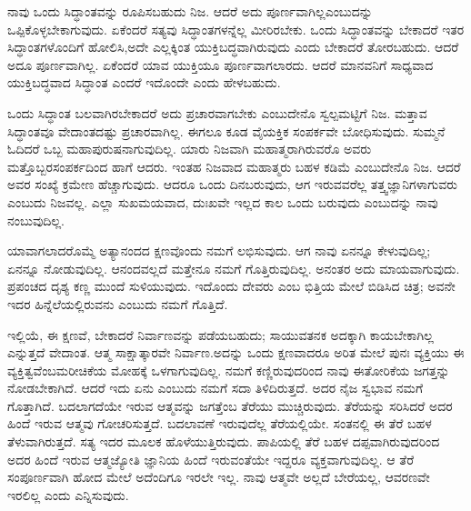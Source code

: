 ನಾವು ಒಂದು ಸಿದ್ಧಾಂತವನ್ನು ರೂಪಿಸಬಹುದು ನಿಜ. ಆದರೆ ಅದು ಪೂರ್ಣವಾಗಿಲ್ಲ\break ಎಂಬುದನ್ನು ಒಪ್ಪಿಕೊಳ್ಳಬೇಕಾಗುವುದು. ಏಕೆಂದರೆ ಸತ್ಯವು ಸಿದ್ಧಾಂತಗಳನ್ನೆಲ್ಲ ಮೀರಿರಬೇಕು. ಒಂದು ಸಿದ್ಧಾಂತವನ್ನು ಬೇಕಾದರೆ ಇತರ ಸಿದ್ಧಾಂತಗಳೊಂದಿಗೆ ಹೋಲಿಸಿ,\break ಅದೇ ಎಲ್ಲಕ್ಕಿಂತ ಯುಕ್ತಿಬದ್ಧವಾಗಿರುವುದು ಎಂದು ಬೇಕಾದರೆ ತೋರಬಹುದು. ಆದರೆ ಅದೂ ಪೂರ್ಣವಾಗಿಲ್ಲ. ಏಕೆಂದರೆ ಯಾವ ಯುಕ್ತಿಯೂ ಪೂರ್ಣವಾಗಲಾರದು. ಆದರೆ ಮಾನವನಿಗೆ ಸಾಧ್ಯವಾದ ಯುಕ್ತಿಬದ್ಧವಾದ ಸಿದ್ಧಾಂತ ಎಂದರೆ ಇದೊಂದೇ ಎಂದು ಹೇಳಬಹುದು.

ಒಂದು ಸಿದ್ಧಾಂತ ಬಲವಾಗಿರಬೇಕಾದರೆ ಅದು ಪ್ರಚಾರವಾಗಬೇಕು ಎಂಬುದೇನೊ ಸ್ವಲ್ಪಮಟ್ಟಿಗೆ ನಿಜ. ಮತ್ತಾವ ಸಿದ್ಧಾಂತವೂ ವೇದಾಂತದಷ್ಟು ಪ್ರಚಾರವಾಗಿಲ್ಲ. ಈಗಲೂ ಕೂಡ ವೈಯಕ್ತಿಕ ಸಂಪರ್ಕವೇ ಬೋಧಿಸುವುದು. ಸುಮ್ಮನೆ ಓದಿದರೆ ಒಬ್ಬ ಮಹಾಪುರುಷನಾಗುವುದಿಲ್ಲ. ಯಾರು ನಿಜವಾಗಿ ಮಹಾತ್ಮರಾಗಿರುವರೊ ಅವರು ಮತ್ತೊಬ್ಬರ\break ಸಂಪರ್ಕದಿಂದ ಹಾಗೆ ಆದರು. ಇಂತಹ ನಿಜವಾದ ಮಹಾತ್ಮರು ಬಹಳ ಕಡಿಮೆ ಎಂಬುದೇನೊ ನಿಜ. ಆದರೆ ಅವರ ಸಂಖ್ಯೆ ಕ್ರಮೇಣ ಹೆಚ್ಚಾಗುವುದು. ಆದರೂ ಒಂದು ದಿನ\break ಬರುವುದು, ಆಗ ಇರುವವರೆಲ್ಲ ತತ್ತ್ವಜ್ಞಾನಿಗಳಾಗುವರು ಎಂಬುದು ನಿಜವಲ್ಲ. ಎಲ್ಲಾ ಸುಖಮಯವಾದ, ದುಃಖವೇ ಇಲ್ಲದ ಕಾಲ ಒಂದು ಬರುವುದು ಎಂಬುದನ್ನು ನಾವು ನಂಬುವುದಿಲ್ಲ.

ಯಾವಾಗಲಾದರೊಮ್ಮೆ ಅತ್ಯಾನಂದದ ಕ್ಷಣವೊಂದು ನಮಗೆ ಲಭಿಸುವುದು. ಆಗ ನಾವು ಏನನ್ನೂ ಕೇಳುವುದಿಲ್ಲ; ಏನನ್ನೂ ನೋಡುವುದಿಲ್ಲ. ಆನಂದವಲ್ಲದೆ ಮತ್ತೇನೂ ನಮಗೆ ಗೊತ್ತಿರುವುದಿಲ್ಲ. ಅನಂತರ ಅದು ಮಾಯವಾಗುವುದು. ಪ್ರಪಂಚದ ದೃಶ್ಯ ಕಣ್ಣ ಮುಂದೆ ಸುಳಿಯುವುದು. ಇದೊಂದು ದೇವರು ಎಂಬ ಭಿತ್ತಿಯ ಮೇಲೆ ಬಿಡಿಸಿದ ಚಿತ್ರ; ಅವನೇ ಇದರ ಹಿನ್ನೆಲೆಯಲ್ಲಿರುವನು ಎಂಬುದು ನಮಗೆ ಗೊತ್ತಿದೆ.

ಇಲ್ಲಿಯೆ, ಈ ಕ್ಷಣವೆ, ಬೇಕಾದರೆ ನಿರ್ವಾಣವನ್ನು ಪಡೆಯಬಹುದು; ಸಾಯುವ\break ತನಕ ಅದಕ್ಕಾಗಿ ಕಾಯಬೇಕಾಗಿಲ್ಲ ಎನ್ನುತ್ತದೆ ವೇದಾಂತ. ಆತ್ಮ ಸಾಕ್ಷಾತ್ಕಾರವೇ ನಿರ್ವಾಣ.\break ಅದನ್ನು ಒಂದು ಕ್ಷಣವಾದರೂ ಅರಿತ ಮೇಲೆ ಪುನಃ ವ್ಯಕ್ತಿಯು ಈ ವ್ಯಕ್ತಿತ್ವವೆಂಬ\break ಮರೀಚಿಕೆಯ ಮೋಹಕ್ಕೆ ಒಳಗಾಗುವುದಿಲ್ಲ. ನಮಗೆ ಕಣ್ಣಿರುವುದರಿಂದ ನಾವು ಈ\break ತೋರಿಕೆಯ ಜಗತ್ತನ್ನು ನೋಡಬೇಕಾಗಿದೆ. ಆದರೆ ಇದು ಏನು ಎಂಬುದು ನಮಗೆ ಸದಾ ತಿಳಿದಿರುತ್ತದೆ. ಅದರ ನೈಜ ಸ್ವಭಾವ ನಮಗೆ ಗೊತ್ತಾಗಿದೆ. ಬದಲಾಗದೆಯೇ ಇರುವ ಆತ್ಮವನ್ನು ಜಗತ್ತೆಂಬ ತೆರೆಯು ಮುಚ್ಚಿರುವುದು. ತೆರೆಯನ್ನು ಸರಿಸಿದರೆ ಅದರ ಹಿಂದೆ ಇರುವ ಆತ್ಮವು ಗೋಚರಿಸುತ್ತದೆ. ಬದಲಾವಣೆ ಇರುವುದೆಲ್ಲ ತೆರೆಯಲ್ಲಿಯೇ. ಸಂತನಲ್ಲಿ ಈ ತೆರೆ ಬಹಳ ತೆಳುವಾಗಿರುತ್ತದೆ. ಸತ್ಯ ಇದರ ಮೂಲಕ ಹೊಳೆಯುತ್ತಿರುವುದು. ಪಾಪಿಯಲ್ಲಿ ತೆರೆ ಬಹಳ ದಪ್ಪವಾಗಿರುವುದರಿಂದ ಅದರ ಹಿಂದೆ ಇರುವ ಆತ್ಮಜ್ಯೋತಿ ಜ್ಞಾನಿಯ ಹಿಂದೆ ಇರುವಂತೆಯೇ ಇದ್ದರೂ ವ್ಯಕ್ತವಾಗುವುದಿಲ್ಲ. ಆ ತೆರೆ ಸಂಪೂರ್ಣವಾಗಿ ಹೋದ ಮೇಲೆ ಅದೆಂದಿಗೂ ಇರಲೇ ಇಲ್ಲ. ನಾವು ಆತ್ಮವೇ ಅಲ್ಲದೆ ಬೇರೆಯಲ್ಲ, ಆವರಣವೇ ಇರಲಿಲ್ಲ ಎಂದು ಎನ್ನಿಸುವುದು.

